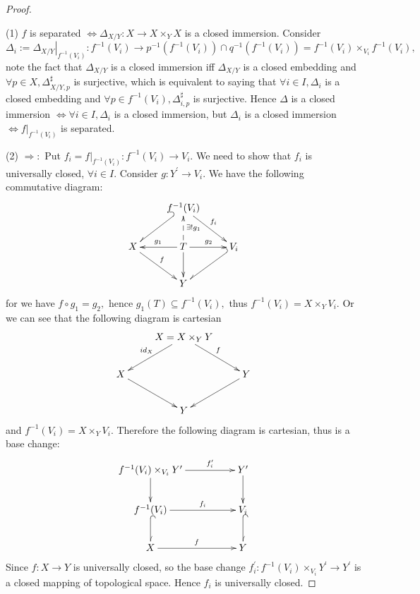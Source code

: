 \begin{proof}\
\enum
\item[(1)]$f$ is separated $\Longleftrightarrow \Delta_{X/Y}:
X\rightarrow X\times_Y X$ is a closed immersion. Consider
$\Delta_i:=\left.\Delta_{X/Y}\right|_{f^{-1}(V_i)}:f^{-1}(V_i)\rightarrow
p^{-1}(f^{-1}(V_i))\cap q^{-1}(f^{-1}(V_i))=f^{-1}(V_i)\times_{V_i}
f^{-1}(V_i),$ note the fact that $\Delta_{X/Y}$ is a closed
immersion iff $\Delta_{X/Y}$ is a closed embedding and $\forall p\in
X, \Delta_{X/Y,p}^{\sharp}$ is surjective, which is equivalent to
saying that $\forall i\in I, \Delta_i$ is a closed embedding and
$\forall p\in f^{-1}(V_i), \Delta_{i,p}^{\sharp}$ is surjective.
Hence $\Delta$ is a closed immersion $\Leftrightarrow \forall i\in
I, \Delta_i$ is a closed immersion, but $\Delta_i$ is a closed
immersion $\Leftrightarrow \left.f\right|_{f^{-1}(V_i)}$ is
separated.
\item[(2)]$\Longrightarrow:$ Put $f_i=\left.f\right|_{f^{-1}(V_i)}:f^{-1}(V_i)\rightarrow
V_i.$ We need to  show that $f_i$ is universally closed, $\forall
i\in I.$ Consider $g:Y^{\prime}\rightarrow V_i.$ We have the
following commutative diagram:
\[ \xymatrix{
   & {f^{-1}(V_i)} \ar@_{(->}"2,1" \ar"2,3"^{f_i}               \\
   X \ar"3,2"^f & T \ar[l]_{g_1} \ar[r]^{g_2} \ar[d] \ar@{-->}[u]_{\exists !g_1}
   & V_i \ar@_{(->}"3,2"   \\
   &  Y} \]
for we have $f\circ g_1=g_2,$ hence $g_1(T)\subseteq f^{-1}(V_i),$
thus $f^{-1}(V_i)=X\times_Y V_i.$ Or we can see that the following
diagram is cartesian
\[ \xymatrix{
   & {X=X\times_Y Y} \ar"2,1"_{id_X} \ar"2,3"^f   \\
   X \ar"3,2" & & Y \ar"3,2"                        \\
   & Y } \]
and $f^{-1}(V_i)=X\times_Y V_i.$ Therefore the following diagram is
cartesian, thus is a base change:
\[ \xymatrix@C=5em{
   {f^{-1}(V_i)\times_{V_i} Y^{\prime}} \ar[d] \ar[r]^-{f_i^{\prime}} &
   {Y^{\prime}} \ar[d]                                          \\
   {f^{-1}(V_i)} \ar[r]^-{f_i} \ar@^{(->}[d] & V_i \ar@^{(->}[d] \\
   X \ar[r]^f & Y}  \]
Since $f: X\rightarrow Y$ is universally closed, so the base change
$f_i^{\prime}: f^{-1}(V_i)\times_{V_i} Y^{\prime}\rightarrow
Y^{\prime}$ is a closed mapping of topological space. Hence $f_i$ is
universally closed.


\end{proof}
